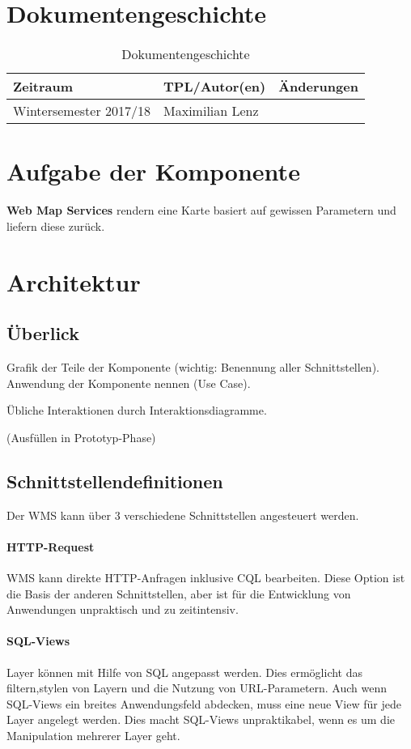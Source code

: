 \section{Dokumentengeschichte}
\begin{table}[h]
 \begin{tabular}{|l|l|l|}
 \hline
 Zeitraum & TPL/Autor(en) & Änderungen \\
 \hline
 Wintersemester 2017/18 & Maximilian Lenz & 
  \\
 \hline
 \end{tabular}
 \caption{Dokumentengeschichte}
 \end{table}

\section{Aufgabe der Komponente}
\textbf{Web Map Services} rendern eine Karte basiert auf gewissen Parametern und liefern diese zur\"uck.
 

\section{Architektur}

\subsection{\"Uberlick}
Grafik der Teile der Komponente (wichtig: Benennung aller Schnittstellen). 
Anwendung der Komponente nennen (Use Case).

Übliche Interaktionen durch Interaktionsdiagramme.

(Ausfüllen in Prototyp-Phase)

\subsection{Schnittstellendefinitionen}
Der WMS kann \"uber 3 verschiedene Schnittstellen angesteuert werden.\\

\paragraph{HTTP-Request}
WMS kann direkte HTTP-Anfragen inklusive CQL bearbeiten. Diese Option ist die Basis der anderen Schnittstellen, aber ist f\"ur die Entwicklung von Anwendungen unpraktisch und zu zeitintensiv.

\paragraph{SQL-Views}
Layer k\"onnen mit Hilfe von SQL angepasst werden. Dies erm\"oglicht das filtern,stylen von Layern und die Nutzung von URL-Parametern. Auch wenn SQL-Views ein breites Anwendungsfeld abdecken, muss eine neue View f\"ur jede Layer angelegt werden. Dies macht SQL-Views unpraktikabel, wenn es um die Manipulation mehrerer Layer geht.

